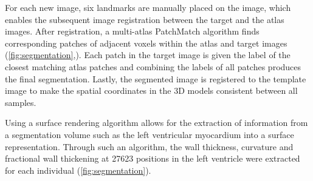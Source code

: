 For each new image, six landmarks are manually placed on the image, which enables the subsequent image registration between the target and the atlas images. After registration, a multi-atlas PatchMatch algorithm finds corresponding patches of adjacent voxels within the atlas and target images (\cref{fig:segmentation},). Each patch in the target image is given the label of the closest matching atlas patches and combining the labels of all patches produces the final segmentation. Lastly, the segmented image is registered to the template image to make the spatial coordinates in the 3D models consistent between all samples.  

Using a surface rendering algorithm allows for the extraction of information from a segmentation volume such as the left ventricular myocardium into a surface representation. Through such an algorithm, the wall thickness, curvature and  fractional wall thickening at \num{27623} positions in the left ventricle were extracted for each individual (\cref{fig:segmentation}). %
\\

